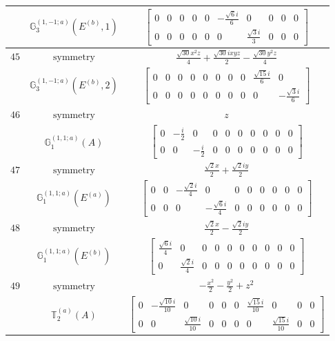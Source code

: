 \documentclass[fleqn,8pt,landscape]{jsarticle}
\begin{document}
\begin{longtable}{ccc}
$  $ & $ \mathbb{G}_{3}^{(1,-1;a)}(E^{(b)},1) $ & $ \begin{bmatrix} 0 & 0 & 0 & 0 & 0 & - \frac{\sqrt{6} i}{6} & 0 & 0 & 0 & 0 \\ 0 & 0 & 0 & 0 & 0 & 0 & \frac{\sqrt{3} i}{3} & 0 & 0 & 0 \end{bmatrix} $ \\ \hline
$ 45 $ & $ \text{symmetry} $ & $ \frac{\sqrt{30} x^{2} z}{4} + \frac{\sqrt{30} i x y z}{2} - \frac{\sqrt{30} y^{2} z}{4} $ \\
$  $ & $ \mathbb{G}_{3}^{(1,-1;a)}(E^{(b)},2) $ & $ \begin{bmatrix} 0 & 0 & 0 & 0 & 0 & 0 & 0 & 0 & \frac{\sqrt{15} i}{6} & 0 \\ 0 & 0 & 0 & 0 & 0 & 0 & 0 & 0 & 0 & - \frac{\sqrt{3} i}{6} \end{bmatrix} $ \\ \hline
$ 46 $ & $ \text{symmetry} $ & $ z $ \\
$  $ & $ \mathbb{G}_{1}^{(1,1;a)}(A) $ & $ \begin{bmatrix} 0 & - \frac{i}{2} & 0 & 0 & 0 & 0 & 0 & 0 & 0 & 0 \\ 0 & 0 & - \frac{i}{2} & 0 & 0 & 0 & 0 & 0 & 0 & 0 \end{bmatrix} $ \\ \hline
$ 47 $ & $ \text{symmetry} $ & $ \frac{\sqrt{2} x}{2} + \frac{\sqrt{2} i y}{2} $ \\
$  $ & $ \mathbb{G}_{1}^{(1,1;a)}(E^{(a)}) $ & $ \begin{bmatrix} 0 & 0 & - \frac{\sqrt{2} i}{4} & 0 & 0 & 0 & 0 & 0 & 0 & 0 \\ 0 & 0 & 0 & - \frac{\sqrt{6} i}{4} & 0 & 0 & 0 & 0 & 0 & 0 \end{bmatrix} $ \\ \hline
$ 48 $ & $ \text{symmetry} $ & $ \frac{\sqrt{2} x}{2} - \frac{\sqrt{2} i y}{2} $ \\
$  $ & $ \mathbb{G}_{1}^{(1,1;a)}(E^{(b)}) $ & $ \begin{bmatrix} \frac{\sqrt{6} i}{4} & 0 & 0 & 0 & 0 & 0 & 0 & 0 & 0 & 0 \\ 0 & \frac{\sqrt{2} i}{4} & 0 & 0 & 0 & 0 & 0 & 0 & 0 & 0 \end{bmatrix} $ \\ \hline
$ 49 $ & $ \text{symmetry} $ & $ - \frac{x^{2}}{2} - \frac{y^{2}}{2} + z^{2} $ \\
$  $ & $ \mathbb{T}_{2}^{(a)}(A) $ & $ \begin{bmatrix} 0 & - \frac{\sqrt{10} i}{10} & 0 & 0 & 0 & 0 & \frac{\sqrt{15} i}{10} & 0 & 0 & 0 \\ 0 & 0 & \frac{\sqrt{10} i}{10} & 0 & 0 & 0 & 0 & \frac{\sqrt{15} i}{10} & 0 & 0 \end{bmatrix} $ \\ \hline

\end{longtable}
\end{document}
